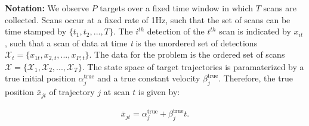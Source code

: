 
{\bf Notation:}
We observe $P$ targets over a fixed time window in which $T$ scans are collected. Scans occur at a fixed rate of 1Hz, such that the set of scans can be time stamped by $\{t_{1}, t_{2},...,T\}. $ The $i^{th}$ detection of the $t^{th}$ scan is indicated by $x_{it}$, such that a scan of data at time \textit{t} is the unordered set of detections $\mathcal{X}_{t} = \{x_{1t}, x_{2,t},...,x_{P,t}\}$. The data for the problem is the ordered set of scans $\boldsymbol{\mathcal{X}}=\{\mathcal{X}_{1},\mathcal{X}_{2},...,\mathcal{X}_{T}\}$. The state space of target trajectories is paramaterized by a true initial position $\alpha^{\text{true}}_{j}$ and a true constant velocity $\beta^{\text{true}}_{j}$. Therefore, the true position $\bar{x}_{jt}$ of trajectory $j$ at scan $t$ is given by: 

\begin{align}
	\bar{x}_{jt} = \alpha^{\text{true}}_{j} + \beta^{\text{true}}_{j}t.
\end{align}